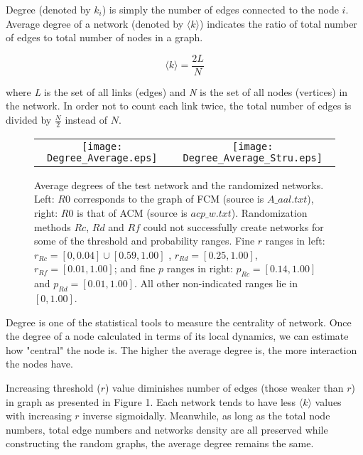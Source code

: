 \documentclass[12pt]{article}
\begin{document}
Degree (denoted by $k_i$) is simply the number of edges connected to the node $i$. Average degree of a network (denoted by $\langle k \rangle$) indicates the ratio of total number of edges to total number of nodes in a graph.
 
\begin{equation}
\langle k \rangle = \frac{2L}{N}
\end{equation} 
 
 where \textit{L} is the set of all links (edges) and \textit{N} is the set of all nodes (vertices) in the network. In order not to count each link twice, the total number of edges is divided by $\frac{N}{2}$ instead of $N$. 
 

\begin{figure}[htp]

  \centering

    \begin{tabular}{cc}


    \texttt{[image: Degree\_Average.eps]} &

    \texttt{[image: Degree\_Average\_Stru.eps]}\\

  \end{tabular}

 \label{figur}\caption{Average degrees of the test network and the randomized networks. Left: $R0$ corresponds to the graph of FCM (source is $A\_aal.txt$), right: $R0$ is that of ACM (source is $acp\_w.txt$). Randomization methods $Rc$, $Rd$ and $Rf$ could not successfully create networks for some of the threshold and probability ranges. Fine $r$ ranges in left: $r_{Rc}=[0,0.04]\cup[0.59,1.00]$ , $r_{Rd} = [0.25,1.00]$, $r_{Rf} = [0.01,1.00]$; and fine $p$ ranges in right: $p_{Rc}=[0.14 , 1.00]$ and $p_{Rd}=[0.01 , 1.00]$. All other non-indicated ranges lie in $[0,1.00]$.  }

\end{figure}

Degree is one of the statistical tools to measure the centrality of network. Once the degree of a node calculated in terms of its local dynamics, we can estimate how "central" the node is. The higher the average degree is, the more interaction the nodes have. 

Increasing threshold ($r$) value diminishes number of edges (those weaker than $r$) in graph as presented in Figure 1. Each network tends to have less $\langle k \rangle$ values with increasing $r$ inverse sigmoidally.  Meanwhile, as long as the total node numbers, total edge numbers and networks density are all preserved while constructing the random graphs, the average degree remains the same. 
	
\end{document}
